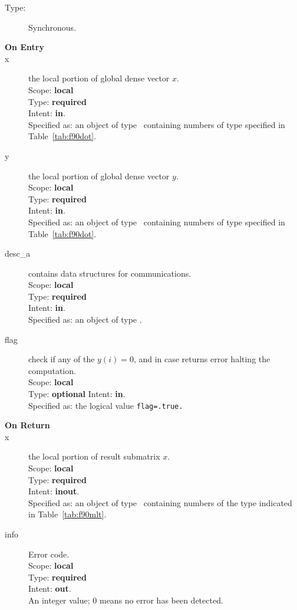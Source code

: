 \begin{description}
	\item[Type:] Synchronous.
	\item[\bf On Entry]
	\item[x] the local portion of global dense vector
	$x$.\\
	Scope: {\bf local} \\
	Type: {\bf required} \\
	Intent: {\bf in}.\\
	Specified as:  an object of type \vdata\ 
	containing numbers of type specified in
	Table~\ref{tab:f90dot}.
	\item[y] the local portion of global dense vector
	$y$. \\
	Scope: {\bf local} \\
	Type: {\bf required} \\
	Intent: {\bf in}.\\
	Specified as:  an object of type \vdata\ 
	containing numbers of type specified in
	Table~\ref{tab:f90dot}.
	\item[desc\_a] contains data structures for communications.\\
	Scope: {\bf local} \\
	Type: {\bf required}\\
	Intent: {\bf in}.\\
	Specified as: an object of type \descdata.
	\item[flag] check if any of the $y(i) = 0$, and in case returns error halting the computation.\\
	Scope: {\bf local} \\
	Type: {\bf optional}
	Intent: {\bf in}.\\
	Specified as: the logical value \verb|flag=.true.|
	\item[\bf On Return] 
	\item[x] the local portion of result submatrix $x$.\\
	Scope: {\bf local} \\
	Type: {\bf required} \\
	Intent: {\bf inout}.\\
	Specified as: an object of type \vdata\ containing numbers of the type
	indicated in Table~\ref{tab:f90mlt}.
	\item[info] Error code.\\
	Scope: {\bf local} \\
	Type: {\bf required} \\
	Intent: {\bf out}.\\
	An integer value; 0 means no error has been detected. 
\end{description}

